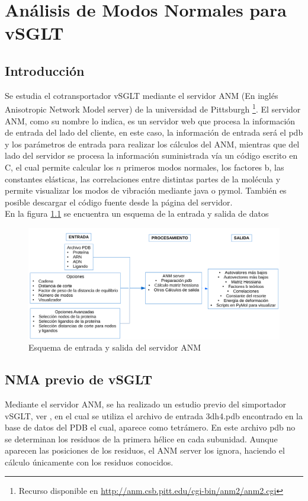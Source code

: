 \chapter{An\'{a}lisis de Modos Normales para vSGLT}\label{ch:4}

\section{Introducci\'{o}n}
Se estudia el cotransportador vSGLT mediante el servidor ANM (En ingl\'{e}s Anisotropic Network Model server) de la universidad de Pittsburgh \cite{Eyal2015}\footnote{Recurso disponible en \url{http://anm.csb.pitt.edu/cgi-bin/anm2/anm2.cgi}}. El servidor ANM, como su nombre lo indica, es un servidor web que procesa la informaci\'{o}n de entrada del lado del cliente, en este caso, la informaci\'{o}n de entrada ser\'{a} el pdb y los par\'{a}metros de entrada para realizar los c\'{a}lculos del ANM, mientras que del lado del servidor se procesa la informaci\'{o}n suministrada v\'{i}a un c\'{o}digo escrito en C, el cual permite calcular los $n$ primeros modos normales, los factores b, las constantes el\'{a}sticas, las correlaciones entre distintas partes de la mol\'{e}cula y permite visualizar los modos de vibraci\'{o}n mediante java o pymol. Tambi\'{e}n es posible descargar el c\'{o}digo fuente desde la p\'{a}gina del servidor.\\

En la figura \ref{fig:flujo} se encuentra un esquema de la entrada y salida de datos
\begin{figure}[h]
 \centering
    \includegraphics[scale=0.6]{./Kap4/flujo.pdf} 
\caption{Esquema de entrada y salida del servidor ANM}\label{fig:flujo}
\end{figure}

\section{NMA previo de vSGLT}
Mediante el servidor ANM, se ha realizado un estudio previo del simportador vSGLT, ver \cite{Cabrera2017}, en el cual se utiliza el archivo de entrada 3dh4.pdb \cite{Faham2008} encontrado en la base de datos del PDB el cual, aparece como tetr\'{a}mero. En este archivo pdb no se determinan los residuos de la primera h\'{e}lice en cada subunidad. Aunque aparecen las posiciones de los residuos, el ANM server los ignora, haciendo el c\'{a}lculo \'{u}nicamente con los residuos conocidos.\\

